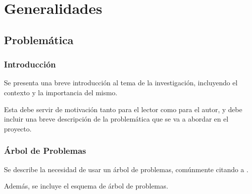 \section{Generalidades}
\label{sec:generalidades}

\subsection{Problemática}
\label{subsec:problematica}

\subsubsection{Introducción}
\label{subsubsec:introduccion}

Se presenta una breve introducción al tema de la investigación, incluyendo el contexto y la importancia del mismo.

Esta debe servir de motivación tanto para el lector como para el autor, y debe incluir una breve descripción de la problemática
que se va a abordar en el proyecto.

\subsubsection{Árbol de Problemas}
\label{subsubsec:arbol_problemas}

Se describe la necesidad de usar un árbol de problemas, comúnmente citando a \textcite{vesely2008arbol}.

Además, se incluye el esquema de árbol de problemas.


